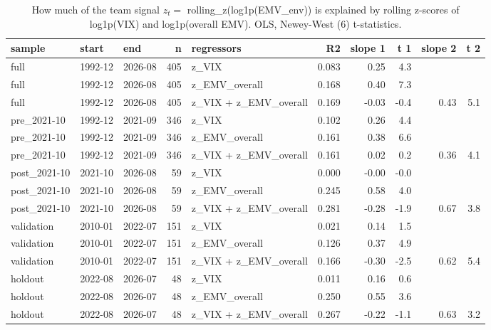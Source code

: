 \begin{table}
\caption{How much of the team signal $z_t=$ rolling\_z(log1p(EMV\_env)) is explained by rolling z-scores of log1p(VIX) and log1p(overall EMV). OLS, Newey-West (6) t-statistics.}
\label{tab:m1_decomp}
\begin{tabular}{lllrlrrrrr}
\toprule
sample & start & end & n & regressors & R2 & slope 1 & t 1 & slope 2 & t 2 \\
\midrule
full & 1992-12 & 2026-08 & 405 & z\_VIX & 0.083 & 0.25 & 4.3 &  &  \\
full & 1992-12 & 2026-08 & 405 & z\_EMV\_overall & 0.168 & 0.40 & 7.3 &  &  \\
full & 1992-12 & 2026-08 & 405 & z\_VIX + z\_EMV\_overall & 0.169 & -0.03 & -0.4 & 0.43 & 5.1 \\
pre\_2021-10 & 1992-12 & 2021-09 & 346 & z\_VIX & 0.102 & 0.26 & 4.4 &  &  \\
pre\_2021-10 & 1992-12 & 2021-09 & 346 & z\_EMV\_overall & 0.161 & 0.38 & 6.6 &  &  \\
pre\_2021-10 & 1992-12 & 2021-09 & 346 & z\_VIX + z\_EMV\_overall & 0.161 & 0.02 & 0.2 & 0.36 & 4.1 \\
post\_2021-10 & 2021-10 & 2026-08 & 59 & z\_VIX & 0.000 & -0.00 & -0.0 &  &  \\
post\_2021-10 & 2021-10 & 2026-08 & 59 & z\_EMV\_overall & 0.245 & 0.58 & 4.0 &  &  \\
post\_2021-10 & 2021-10 & 2026-08 & 59 & z\_VIX + z\_EMV\_overall & 0.281 & -0.28 & -1.9 & 0.67 & 3.8 \\
validation & 2010-01 & 2022-07 & 151 & z\_VIX & 0.021 & 0.14 & 1.5 &  &  \\
validation & 2010-01 & 2022-07 & 151 & z\_EMV\_overall & 0.126 & 0.37 & 4.9 &  &  \\
validation & 2010-01 & 2022-07 & 151 & z\_VIX + z\_EMV\_overall & 0.166 & -0.30 & -2.5 & 0.62 & 5.4 \\
holdout & 2022-08 & 2026-07 & 48 & z\_VIX & 0.011 & 0.16 & 0.6 &  &  \\
holdout & 2022-08 & 2026-07 & 48 & z\_EMV\_overall & 0.250 & 0.55 & 3.6 &  &  \\
holdout & 2022-08 & 2026-07 & 48 & z\_VIX + z\_EMV\_overall & 0.267 & -0.22 & -1.1 & 0.63 & 3.2 \\
\bottomrule
\end{tabular}
\end{table}
